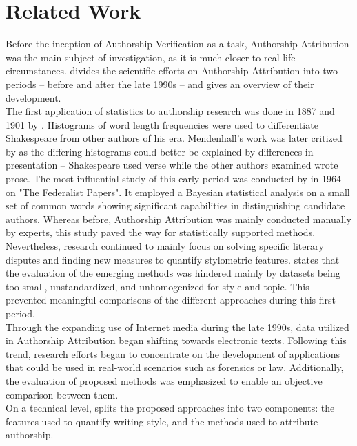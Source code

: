 \chapter{Related Work}\label{related_work}
Before the inception of Authorship Verification as a task, Authorship Attribution was the main subject of investigation, as it is much closer to real-life circumstances.
\cite{stamatatos2009survey} divides the scientific efforts on Authorship Attribution into two periods -- before and after the late 1990s -- and gives an overview of their development.\\
The first application of statistics to authorship research was done in 1887 and 1901 by \citeauthor{mendenhall1887characteristic}.
Histograms of word length frequencies were used to differentiate Shakespeare from other authors of his era.
Mendenhall's work was later critized by \cite{williams1975mendenhall} as the differing histograms could better be explained by differences in presentation -- Shakespeare used verse while the other authors examined wrote prose.
The most influential study of this early period was conducted by \citeauthor{mosteller1964inference} in 1964 on "The Federalist Papers".
It employed a Bayesian statistical analysis on a small set of common words showing significant capabilities in distinguishing candidate authors.
Whereas before, Authorship Attribution was mainly conducted manually by experts, this study paved the way for statistically supported methods.
Nevertheless, research continued to mainly focus on solving specific literary disputes and finding new measures to quantify stylometric features.
\citeauthor{stamatatos2009survey} states that the evaluation of the emerging methods was hindered mainly by datasets being too small, unstandardized, and unhomogenized for style and topic.
This prevented meaningful comparisons of the different approaches during this first period.\\
Through the expanding use of Internet media during the late 1990s, data utilized in Authorship Attribution began shifting towards electronic texts.
Following this trend, research efforts began to concentrate on the development of applications that could be used in real-world scenarios such as forensics or law.
Additionally, the evaluation of proposed methods was emphasized to enable an objective comparison between them.\\
On a technical level, \citeauthor{stamatatos2009survey} splits the proposed approaches into two components: the features used to quantify writing style, and the methods used to attribute authorship.
